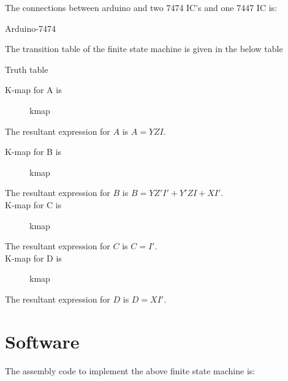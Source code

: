 \documentclass{article}
\begin{document}
The connections between arduino and two 7474 IC's and one 7447 IC is:
	\begin{table}[h]
		\begin{center}
	
			\caption{Arduino-7474}
			\label{table:1}
	\end{center}
	\end{table}

The transition table of the finite state machine is given in the below table \\
\pagebreak
	\begin{table}[h]
	\begin{center}
		
		\caption{Truth table}
		\label{table:3}
	\end{center}
	\end{table}


K-map for A is \\
\begin{figure}[h]
		\centering
		
		\caption{kmap}
		\label{fig:3}
\end{figure}


The resultant expression for $A$ is $ A = YZI $.\\

\pagebreak

K-map for B is \\
\begin{figure}[h]
	\centering
	
	\caption{kmap}
	\label{fig:4}
\end{figure}

The resultant expression for $B$ is $ B = YZ'I'+Y'ZI+XI' $.\\

K-map for C is \\
\begin{figure}[h]
	\centering
	
	\caption{kmap}
	\label{fig:5}
\end{figure}

The resultant expression for $C$ is $ C = I' $.\\

K-map for D is \\
\begin{figure}[h]
	\centering
	
	\caption{kmap}
	\label{fig:6}
\end{figure}

The resultant expression for $D$ is $ D = XI' $.\\

\section{Software}

The assembly code to implement the above finite state machine is: \\
		
\end{document}
